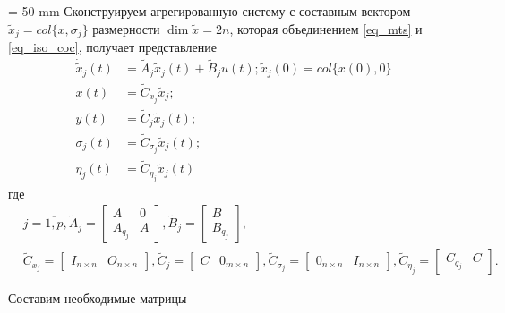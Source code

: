 \rightmargin = 50 mm
Сконструируем агрегированную систему с составным вектором \newline $\tilde{x}_j = col\{x, \sigma_j\}$ размерности $ \dim \tilde{x} = 2n$, которая объединением \ref{eq_mts} и \ref{eq_iso_coc}, получает представление
\begin{align}\label{rang_system}
	\dot{\tilde{x}}_j (t) &= \tilde{A}_j \tilde{x}_j (t) + \tilde{B}_j u(t); 
	\tilde{x}_j (0) = col \{x(0), 0\}\\
	x(t) &= \tilde{C}_{x_j} \tilde{x}_j;\\
	y(t) &= \tilde{C}_j \tilde{x}_j (t);\\
	\sigma_j (t) &= \tilde{C}_{\sigma_j} \tilde{x}_j (t);\\
	\eta_j (t) &= \tilde{C}_{\eta_j} \tilde{x}_j (t)
\end{align}
где 
\begin{align*}
	&j = \overline{1, p},
	\tilde{A}_j =
	\begin{bmatrix}
	A & 0\\
	A_{q_j} & A
	\end{bmatrix},
	\tilde{B}_j = 
	\begin{bmatrix}
		B\\
		B_{q_j}
	\end{bmatrix},\\
	&\tilde{C}_{x_j} = 
	\begin{bmatrix}
		I_{n \times n} & O_{n \times n}
	\end{bmatrix},
	\tilde{C}_{j} = 
	\begin{bmatrix}
		C & 0_{m \times n}
	\end{bmatrix},
	\tilde{C}_{\sigma_{j}} = 
	\begin{bmatrix}
		0_{n \times n} & I_{n \times n}
	\end{bmatrix},
	\tilde{C}_{\eta_{j}} = 
	\begin{bmatrix}
		C_{q_j} & C
	\end{bmatrix}.	
\end{align*}

Составим необходимые матрицы

